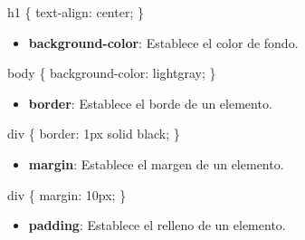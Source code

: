 \documentclass[
  a4paper,
  DIV=11,
  numbers=noendperiod,
  onepage,
  openany]{scrreprt}
\newenvironment{Shaded}{\begin{snugshade}}{\end{snugshade}}
\newcommand{\ConstantTok}[1]{\textcolor[rgb]{0.56,0.35,0.01}{#1}}
\newcommand{\DataTypeTok}[1]{\textcolor[rgb]{0.68,0.00,0.00}{#1}}
\newcommand{\DecValTok}[1]{\textcolor[rgb]{0.68,0.00,0.00}{#1}}
\newcommand{\KeywordTok}[1]{\textcolor[rgb]{0.00,0.23,0.31}{#1}}
\newcommand{\NormalTok}[1]{\textcolor[rgb]{0.00,0.23,0.31}{#1}}
\newcommand{\OperatorTok}[1]{\textcolor[rgb]{0.37,0.37,0.37}{#1}}
\providecommand{\tightlist}{%
  \setlength{\itemsep}{0pt}\setlength{\parskip}{0pt}}\usepackage{longtable,booktabs,array}
\begin{document}
\begin{Shaded}
\begin{Highlighting}[]
\NormalTok{h1 \{}
  \KeywordTok{text{-}align}\NormalTok{: }\DecValTok{center}\OperatorTok{;}
\NormalTok{\}}
\end{Highlighting}
\end{Shaded}

\begin{itemize}
\tightlist
\item
  \textbf{background-color}: Establece el color de fondo.
\end{itemize}

\begin{Shaded}
\begin{Highlighting}[]
\NormalTok{body \{}
  \KeywordTok{background{-}color}\NormalTok{: }\ConstantTok{lightgray}\OperatorTok{;}
\NormalTok{\}}
\end{Highlighting}
\end{Shaded}

\begin{itemize}
\tightlist
\item
  \textbf{border}: Establece el borde de un elemento.
\end{itemize}

\begin{Shaded}
\begin{Highlighting}[]
\NormalTok{div \{}
  \KeywordTok{border}\NormalTok{: }\DecValTok{1}\DataTypeTok{px} \DecValTok{solid} \ConstantTok{black}\OperatorTok{;}
\NormalTok{\}}
\end{Highlighting}
\end{Shaded}

\begin{itemize}
\tightlist
\item
  \textbf{margin}: Establece el margen de un elemento.
\end{itemize}

\begin{Shaded}
\begin{Highlighting}[]
\NormalTok{div \{}
  \KeywordTok{margin}\NormalTok{: }\DecValTok{10}\DataTypeTok{px}\OperatorTok{;}
\NormalTok{\}}
\end{Highlighting}
\end{Shaded}

\begin{itemize}
\tightlist
\item
  \textbf{padding}: Establece el relleno de un elemento.
\end{itemize}
\end{document}
